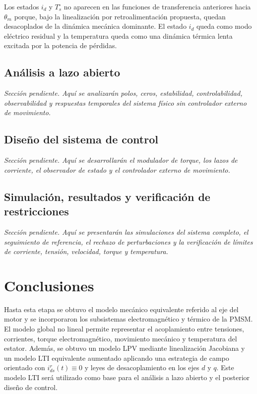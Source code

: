 \documentclass[10pt,a4paper]{article}
\begin{document}
Los estados \(i_d\) y \(T_s^{\circ}\) no aparecen en las funciones de transferencia anteriores hacia \(\theta_m\) porque, bajo la linealización por retroalimentación propuesta, quedan desacoplados de la dinámica mecánica dominante. El estado \(i_d\) queda como modo eléctrico residual y la temperatura queda como una dinámica térmica lenta excitada por la potencia de pérdidas.

\subsection{Análisis a lazo abierto}
\textit{Sección pendiente. Aquí se analizarán polos, ceros, estabilidad, controlabilidad, observabilidad y respuestas temporales del sistema físico sin controlador externo de movimiento.}

\subsection{Diseño del sistema de control}
\textit{Sección pendiente. Aquí se desarrollarán el modulador de torque, los lazos de corriente, el observador de estado y el controlador externo de movimiento.}

\subsection{Simulación, resultados y verificación de restricciones}
\textit{Sección pendiente. Aquí se presentarán las simulaciones del sistema completo, el seguimiento de referencia, el rechazo de perturbaciones y la verificación de límites de corriente, tensión, velocidad, torque y temperatura.}

\section{Conclusiones}

Hasta esta etapa se obtuvo el modelo mecánico equivalente referido al eje del motor y se incorporaron los subsistemas electromagnético y térmico de la PMSM. El modelo global no lineal permite representar el acoplamiento entre tensiones, corrientes, torque electromagnético, movimiento mecánico y temperatura del estator. Además, se obtuvo un modelo LPV mediante linealización Jacobiana y un modelo LTI equivalente aumentado aplicando una estrategia de campo orientado con \(i_{ds}^{r}(t)\equiv0\) y leyes de desacoplamiento en los ejes \(d\) y \(q\). Este modelo LTI será utilizado como base para el análisis a lazo abierto y el posterior diseño de control.
\end{document}
